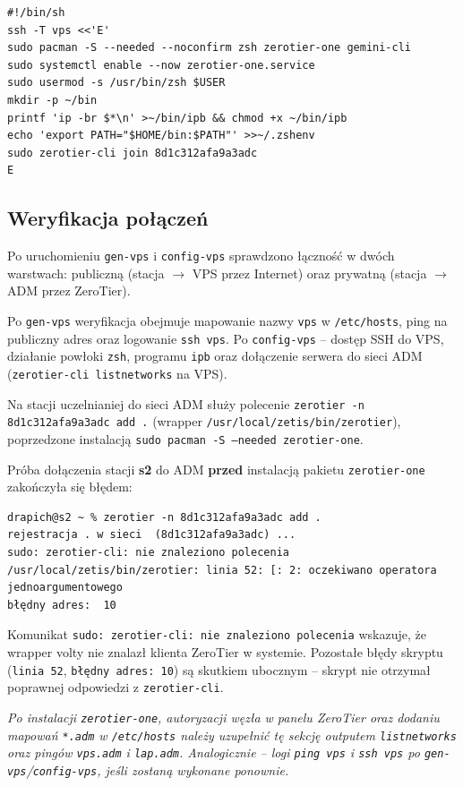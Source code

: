 \documentclass[a4paper,10pt]{article}
\begin{document}
\begin{lstlisting}
#!/bin/sh
ssh -T vps <<'E'
sudo pacman -S --needed --noconfirm zsh zerotier-one gemini-cli
sudo systemctl enable --now zerotier-one.service
sudo usermod -s /usr/bin/zsh $USER
mkdir -p ~/bin
printf 'ip -br $*\n' >~/bin/ipb && chmod +x ~/bin/ipb
echo 'export PATH="$HOME/bin:$PATH"' >>~/.zshenv
sudo zerotier-cli join 8d1c312afa9a3adc
E
\end{lstlisting}

\subsection{Weryfikacja połączeń}

Po uruchomieniu \texttt{gen-vps} i \texttt{config-vps} sprawdzono łączność
w dwóch warstwach: publiczną (stacja $\rightarrow$ VPS przez Internet)
oraz prywatną (stacja $\rightarrow$ ADM przez ZeroTier).

Po \texttt{gen-vps} weryfikacja obejmuje mapowanie nazwy \texttt{vps}
w \texttt{/etc/hosts}, ping na publiczny adres oraz logowanie \texttt{ssh vps}.
Po \texttt{config-vps} -- dostęp SSH do VPS, działanie powłoki \texttt{zsh},
programu \texttt{ipb} oraz dołączenie serwera do sieci ADM
(\texttt{zerotier-cli listnetworks} na VPS).

Na stacji uczelnianiej do sieci ADM służy polecenie
\texttt{zerotier -n 8d1c312afa9a3adc add .}
(wrapper \texttt{/usr/local/zetis/bin/zerotier}), poprzedzone instalacją
\texttt{sudo pacman -S --needed zerotier-one}.

Próba dołączenia stacji \textbf{s2} do ADM \textbf{przed} instalacją pakietu
\texttt{zerotier-one} zakończyła się błędem:

\begin{lstlisting}
drapich@s2 ~ % zerotier -n 8d1c312afa9a3adc add .
rejestracja . w sieci  (8d1c312afa9a3adc) ...
sudo: zerotier-cli: nie znaleziono polecenia
/usr/local/zetis/bin/zerotier: linia 52: [: 2: oczekiwano operatora jednoargumentowego
błędny adres:  10
\end{lstlisting}

Komunikat \texttt{sudo: zerotier-cli: nie znaleziono polecenia} wskazuje,
że wrapper volty nie znalazł klienta ZeroTier w systemie.
Pozostałe błędy skryptu (\texttt{linia 52}, \texttt{błędny adres: 10})
są skutkiem ubocznym -- skrypt nie otrzymał poprawnej odpowiedzi
z \texttt{zerotier-cli}.

\textit{Po instalacji \texttt{zerotier-one}, autoryzacji węzła w panelu ZeroTier
oraz dodaniu mapowań \texttt{*.adm} w \texttt{/etc/hosts} należy uzupełnić
tę sekcję outputem \texttt{listnetworks} oraz pingów \texttt{vps.adm}
i \texttt{lap.adm}. Analogicznie -- logi \texttt{ping vps} i \texttt{ssh vps}
po \texttt{gen-vps}/\texttt{config-vps}, jeśli zostaną wykonane ponownie.}
\end{document}
